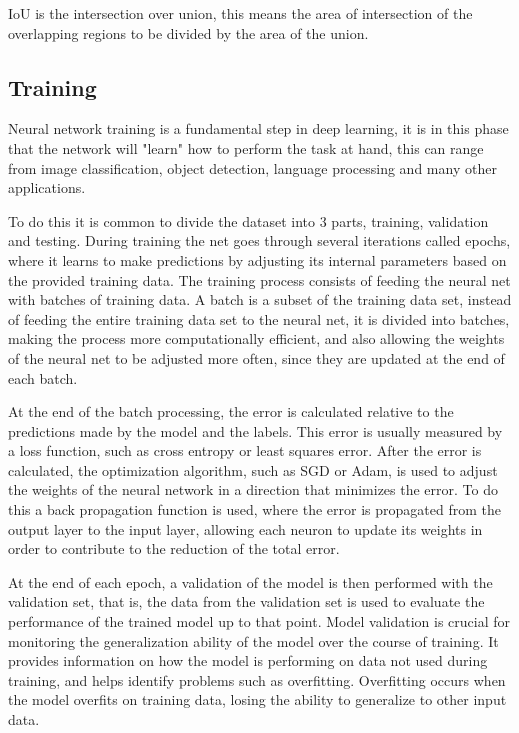 IoU is the intersection over union, this means the area of intersection of the overlapping regions to be divided by the area of the union.


\subsection{Training}
Neural network training is a fundamental step in deep learning, it is in this phase that the network will "learn" how to perform the task at hand, this can range from image classification, object detection, language processing and many other applications.

To do this it is common to divide the dataset into 3 parts, training, validation and testing. During training the net goes through several iterations called epochs, where it learns to make predictions by adjusting its internal parameters based on the provided training data.
The training process consists of feeding the neural net with batches of training data.
A batch is a subset of the training data set, instead of feeding the entire training data set to the neural net, it is divided into batches, making the process more computationally efficient, and also allowing the weights of the neural net to be adjusted more often, since they are updated at the end of each batch.

At the end of the batch processing, the error is calculated relative to the predictions made by the model and the labels. This error is usually measured by a loss function, such as cross entropy or least squares error. After the error is calculated, the optimization algorithm, such as SGD or Adam, is used to adjust the weights of the neural network in a direction that minimizes the error. To do this a back propagation function is used, where the error is propagated from the output layer to the input layer, allowing each neuron to update its weights in order to contribute to the reduction of the total error.

At the end of each epoch, a validation of the model is then performed with the validation set, that is, the data from the validation set is used to evaluate the performance of the trained model up to that point. Model validation is crucial for monitoring the generalization ability of the model over the course of training. It provides information on how the model is performing on data not used during training, and helps identify problems such as overfitting. Overfitting occurs when the model overfits on training data, losing the ability to generalize to other input data.

